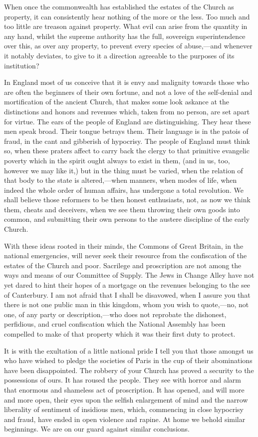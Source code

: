 When once the commonwealth has established the estates of the Church as property, it can consistently hear nothing of the more or the less. Too much and too little are treason against property. What evil can arise from the quantity in any hand, whilst the supreme authority has the full, sovereign superintendence over this, as over any property, to prevent every species of abuse,—and whenever it notably deviates, to give to it a direction agreeable to the purposes of its institution?

In England most of us conceive that it is envy and malignity towards those who are often the beginners of their own fortune, and not a love of the self-denial and mortification of the ancient Church, that makes some look askance at the distinctions and honors and revenues which, taken from no person, are set apart for virtue. The ears of the people of England are distinguishing. They hear these men speak broad. Their tongue betrays them. Their language is in the patois of fraud, in the cant and gibberish of hypocrisy. The people of England must think so, when these praters affect to carry back the clergy to that primitive evangelic poverty which in the spirit ought always to exist in them, (and in us, too, however we may like it,) but in the thing must be varied, when the relation of that body to the state is altered,—when manners, when modes of life, when indeed the whole order of human affairs, has undergone a total revolution. We shall believe those reformers to be then honest enthusiasts, not, as now we think them, cheats and deceivers, when we see them throwing their own goods into common, and submitting their own persons to the austere discipline of the early Church.

With these ideas rooted in their minds, the Commons of Great Britain, in the national emergencies, will never seek their resource from the confiscation of the estates of the Church and poor. Sacrilege and proscription are not among the ways and means of our Committee of Supply. The Jews in Change Alley have not yet dared to hint their hopes of a mortgage on the revenues belonging to the see of Canterbury. I am not afraid that I shall be disavowed, when I assure you that there is not one public man in this kingdom, whom you wish to quote,—no, not one, of any party or description,—who does not reprobate the dishonest, perfidious, and cruel confiscation which the National Assembly has been compelled to make of that property which it was their first duty to protect.

It is with the exultation of a little national pride I tell you that those amongst us who have wished to pledge the societies of Paris in the cup of their abominations have been disappointed. The robbery of your Church has proved a security to the possessions of ours. It has roused the people. They see with horror and alarm that enormous and shameless act of proscription. It has opened, and will more and more open, their eyes upon the selfish enlargement of mind and the narrow liberality of sentiment of insidious men, which, commencing in close hypocrisy and fraud, have ended in open violence and rapine. At home we behold similar beginnings. We are on our guard against similar conclusions.

